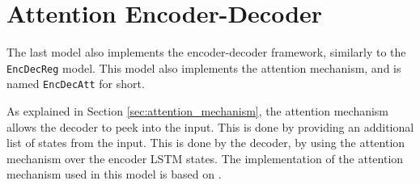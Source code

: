 
\section{Attention Encoder-Decoder}
The last model also implements the encoder-decoder framework, similarly to the {\tt EncDecReg} model. This model also implements the attention mechanism, and is named {\tt EncDecAtt} for short.

As explained in Section \ref{sec:attention_mechanism}, the attention mechanism allows the decoder to peek into the input. This is done by providing an additional list of states from the input. This is done by the decoder, by using the attention mechanism over the encoder LSTM states. The implementation of the attention mechanism used in this model is based on \citep{vinyals2015grammar}.

